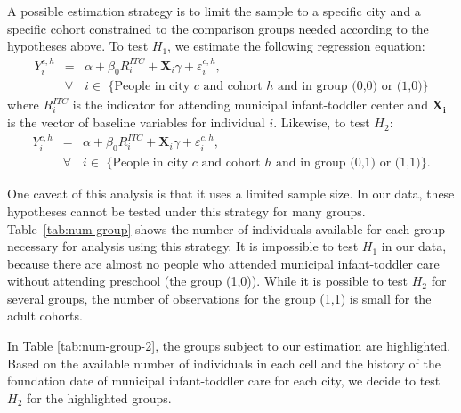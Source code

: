 A possible estimation strategy is to limit the sample to a specific city and a specific cohort constrained to the comparison groups needed according to the hypotheses above. To test $H_1$, we estimate the following regression equation:
\begin{eqnarray}
Y_{i}^{c,h} & = & \alpha + \beta_{0}R_i^{ITC} + \mathbf{X}_i\gamma + \varepsilon_{i}^{c,h}, \\ \nonumber
& \forall & i \in \text{ \{People in city $c$ and cohort $h$ and in group (0,0) or (1,0)\}}
\end{eqnarray}
where $R_i^{ITC}$ is the indicator for attending municipal infant-toddler center and $\mathbf{X_i}$ is the vector of baseline variables for individual $i$. Likewise, to test $H_2$:
\begin{eqnarray}
Y_{i}^{c,h} & = & \alpha + \beta_{0}R_i^{ITC} + \mathbf{X}_i\gamma + \varepsilon_{i}^{c,h}, \\ \nonumber
& \forall & i \in \text{ \{People in city $c$ and cohort $h$ and in group (0,1) or (1,1)\}.}
\end{eqnarray}

One caveat of this analysis is that it uses a limited sample size. In our data, these hypotheses cannot be tested under this strategy for many groups. Table~\ref{tab:num-group} shows the number of individuals available for each group necessary for analysis using this strategy. It is impossible to test $H_1$ in our data, because there are almost no people who attended municipal infant-toddler care without attending preschool (the group (1,0)). While it is possible to test $H_2$ for several groups, the number of observations for the group (1,1) is small for the adult cohorts. 

In Table \ref{tab:num-group-2}, the groups subject to our estimation are highlighted. Based on the available number of individuals in each cell and the history of the foundation date of municipal infant-toddler care for each city, we decide to test $H_2$ for the highlighted groups.

